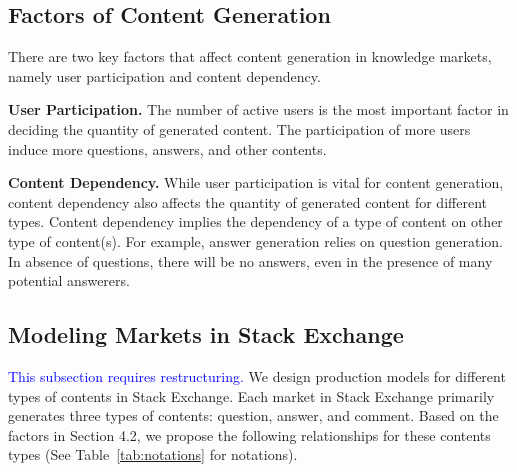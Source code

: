 \subsection{Factors of Content Generation} 
There are two key factors that affect content generation in knowledge markets, namely user participation and content dependency.

\textbf{User Participation.} The number of active users is the most important factor in deciding the quantity of generated content. The participation of more users induce more questions, answers, and other contents.

\textbf{Content Dependency.} While user participation is vital for content generation, content dependency also affects the quantity of generated content for different types. Content dependency implies the dependency of a type of content on other type of content(s). For example, answer generation relies on question generation. In absence of questions, there will be no answers, even in the presence of many potential answerers. 

\subsection{Modeling Markets in Stack Exchange}
\textcolor{blue}{This subsection requires restructuring.}
We design production models for different types of contents in Stack Exchange. Each market in Stack Exchange primarily generates three types of contents: question, answer, and comment. Based on the factors in Section 4.2, we propose the following relationships for these contents types (See Table~\ref{tab:notations} for notations).


